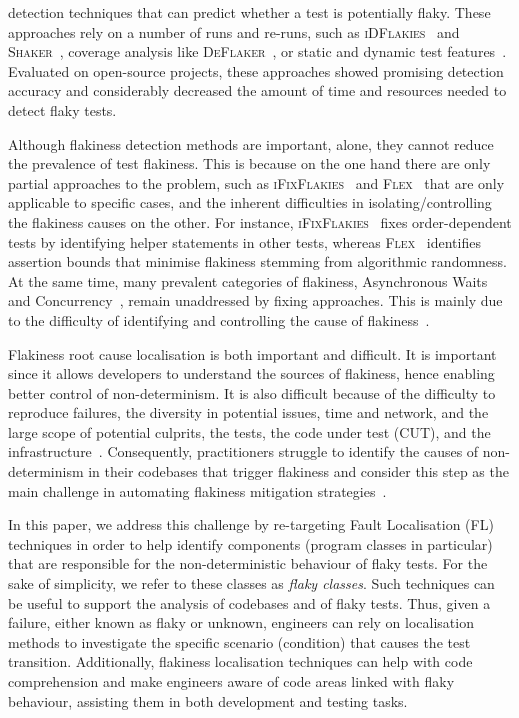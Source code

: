 detection techniques that can predict whether a test is potentially flaky. These approaches rely on a number of runs and re-runs, such as \textsc{iDFlakies}~\cite{Lam2019iDFlakies} and \textsc{Shaker}~\cite{Silva2020}, coverage analysis like \textsc{DeFlaker}~\cite{Bell2018}, or static and dynamic test features~\cite{FlakeFlagger,Haben2021,Pinto2020,Dong2021,Camara2021VocabExtendedReplication,camara2021use,fatima2021flakify}.  
Evaluated on open-source projects, these approaches showed promising detection accuracy and considerably decreased the amount of time and resources needed to detect flaky tests. 

Although flakiness detection methods are important, alone, they cannot reduce the prevalence of test flakiness. This is because on the one hand there are only partial approaches to  the problem,  such as  \textsc{iFixFlakies}~\cite{Shi2019iFix} and \textsc{Flex}~\cite{FLEX} that are only applicable to specific cases, and the inherent difficulties in isolating/controlling the flakiness causes on the other. For instance, \textsc{iFixFlakies}~\cite{Shi2019iFix} fixes order-dependent tests by identifying helper statements in other tests, whereas \textsc{Flex}~\cite{FLEX} identifies  assertion bounds that minimise flakiness stemming from algorithmic randomness. At the same time, many prevalent categories of flakiness, \eg  Asynchronous Waits and Concurrency~\cite{Gruber2021,romano2021empirical,Luo2014, Eck2019}, remain unaddressed by fixing approaches. This is mainly due to the difficulty of identifying  and controlling the cause of flakiness~\cite{Eck2019}. 

Flakiness root cause localisation is both important and difficult. It is important since it allows developers to understand the sources of flakiness, hence enabling better control of non-determinism. It is also difficult because of the difficulty to reproduce failures, the diversity in potential issues, \eg time and network, and the large scope of potential culprits, \eg the tests, the code under test (CUT), and the infrastructure~\cite{Gruber2021}. Consequently, practitioners struggle to identify the causes of non-determinism in their codebases that trigger flakiness and consider this step as the main challenge in automating flakiness mitigation strategies~\cite{Eck2019}. 

In this paper, we address this challenge by re-targeting Fault Localisation (FL) techniques in order to help identify components (program classes in particular) that are responsible for the non-deterministic behaviour of flaky tests. For the sake of simplicity, we refer to these classes as \textit{flaky classes}. Such techniques can be useful to support the analysis  of codebases and of flaky tests. Thus, given a failure, either known as flaky or unknown, engineers can rely on localisation methods to investigate the specific scenario (condition) that causes the test transition. Additionally, flakiness localisation techniques can help with code comprehension and make engineers aware of code areas linked with flaky behaviour, assisting them in both development and testing tasks. 

